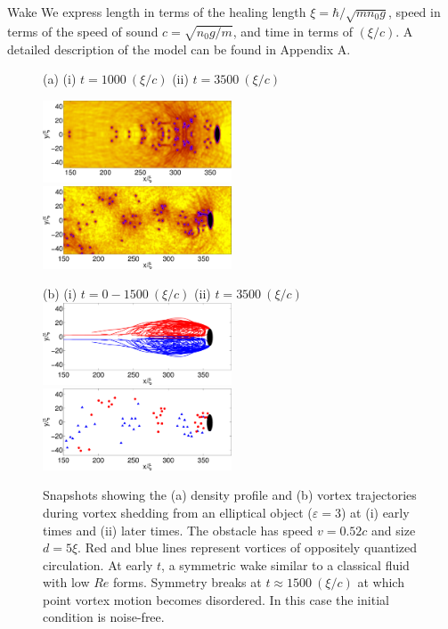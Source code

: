 \begin{chapter}{\label{cha:wake}Wake}
We express length in terms of the healing length $\xi = \hbar/\sqrt{m n_0 g}$, speed in terms of the speed of sound $c=\sqrt{n_0 g/m}$, and time in terms of $(\xi/c)$.
A detailed description of the model can be found in Appendix A.

\begin{figure}
(a) \hspace{1.8cm} (i)  $t = 1000 ~(\xi/c)$ \hspace{2.4cm} \hspace{1.8cm} (ii)   $t= 3500~ (\xi/c)$
\\
\vspace{-0.3cm}

\label{fig:dens3}\includegraphics[width=0.5\textwidth]{wake/figure2ai}
\label{fig:dens4}\includegraphics[width=0.5\textwidth]{wake/figure2aii}

\vspace{0.2cm}
(b)\hspace{1.8cm} (i)  $t = 0-1500 ~(\xi/c)$ \hspace{2.4cm} \hspace{1.2cm} (ii)   $t= 3500~ (\xi/c)$
\\
\vspace{0.3cm}
  \includegraphics[width=0.5\textwidth]{wake/figure2bi}
  \includegraphics[width=0.5\textwidth]{wake/figure2bii}
  \caption{Snapshots showing the (a) density profile and (b) vortex trajectories during vortex shedding from an elliptical object ($\varepsilon = 3$) at (i) early times and (ii) later times.  The obstacle has speed $v=0.52c$ and size $d = 5\xi$. Red and blue lines represent vortices of oppositely quantized circulation. At early $t$, a symmetric wake similar to a classical fluid with low $Re$ forms. Symmetry breaks at $t\approx1500~(\xi/c)$ at which point vortex motion becomes disordered. In this case the initial condition is noise-free.}
  \label{fig:denstraj}
\end{figure}

\end{chapter}
